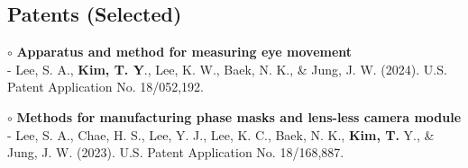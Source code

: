 \documentclass[a4paper,9pt]{extarticle}
\begin{document}
\begin{spacing}{1.05}






\section*{Patents (Selected)} 

\noindent $\circ$ \textbf{Apparatus and method for measuring eye movement}\\
- Lee, S. A., \textbf{Kim, T. Y}., Lee, K. W., Baek, N. K., \& Jung, J. W. (2024). U.S. Patent Application No. 18/052,192.

\noindent $\circ$ \textbf{Methods for manufacturing phase masks and lens-less camera module}\\
- Lee, S. A., Chae, H. S., Lee, Y. J., Lee, K. C., Baek, N. K., \textbf{Kim, T.} Y., \& Jung, J. W. (2023). U.S. Patent Application No. 18/168,887.


\end{spacing}
\end{document}
